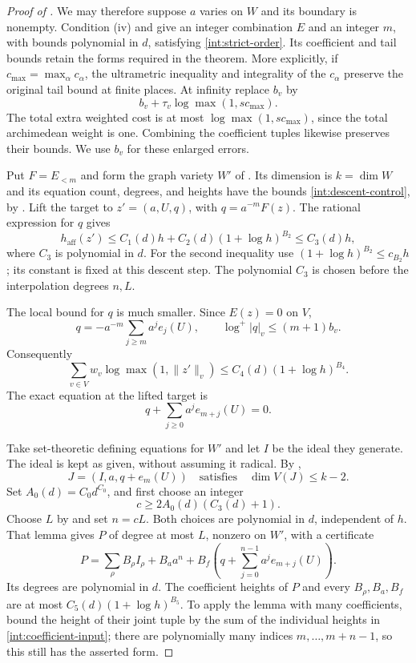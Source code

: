\begin{proof}[Proof of ]
We may therefore suppose $a$ varies on $W$ and its boundary is
nonempty.  Condition \textup{(iv)} and  give
an integer combination $E$ and an integer $m$, with bounds polynomial
in $d$, satisfying \eqref{int:strict-order}.  Its coefficient and
tail bounds retain the forms required in the theorem.  More
explicitly, if $c_{\max}=\max_\alpha c_\alpha$, the ultrametric
inequality and integrality of the $c_\alpha$ preserve the original
tail bound at finite places.  At infinity replace $b_v$ by
\[
 b_v+\tau_v\log\max(1,s c_{\max}).
\]
The total extra weighted cost is at most
$\log\max(1,s c_{\max})$, since the total archimedean weight is one.
Combining the coefficient tuples likewise preserves their bounds.
We use $b_v$ for these enlarged errors.

Put $F=E_{<m}$ and form the graph variety $W'$ of
.  Its dimension is $k=\dim W$ and its equation
count, degrees, and heights have the bounds
\eqref{int:descent-control}, by .  Lift the target
to $z'=(a,U,q)$, with $q=a^{-m}F(z)$.  The rational expression for
$q$ gives
\[
 h_{\mathrm{aff}}(z')
   \leq C_1(d)h+C_2(d)(1+\log h)^{B_2}
   \leq C_3(d)h,
\]
where $C_3$ is polynomial in $d$.  For the second inequality use
$(1+\log h)^{B_2}\leq c_{B_2}h$; its constant is fixed at this
descent step.  The polynomial $C_3$ is chosen before the interpolation
degrees $n,L$.

The local bound for $q$ is much smaller.  Since $E(z)=0$ on $V$,
\[
 q=-a^{-m}\sum_{j\geq m}a^je_j(U),
 \qquad
 \log^+|q|_v\leq(m+1)b_v.
\]
Consequently
\begin{equation}\label{int:lifted-local}
 \sum_{v\in V}w_v\log\max(1,\|z'\|_v)
    \leq C_4(d)(1+\log h)^{B_4}.
\end{equation}
The exact equation at the lifted target is
\[
 q+\sum_{j\geq0}a^je_{m+j}(U)=0.
\]

Take set-theoretic defining equations for $W'$ and let $I$ be the
ideal they generate.  The ideal is kept as given, without assuming
it radical.  By ,
\[
 J=(I,a,q+e_m(U))
 \quad\text{satisfies}\quad\dim V(J)\leq k-2.
\]
Set $A_0(d)=C_0d^{C_0}$, and first choose an integer
\begin{equation}\label{int:ratio-choice}
 c\geq 2A_0(d)(C_3(d)+1).
\end{equation}
Choose $L$ by  and set $n=cL$.
Both choices are polynomial in $d$, independent of $h$.  That lemma
gives $P$ of degree at most $L$, nonzero on $W'$, with a certificate
\begin{equation}\label{int:certificate}
 P=\sum_\rho B_\rho I_\rho+B_a a^n
       +B_f\left(q+\sum_{j=0}^{n-1}a^je_{m+j}(U)\right).
\end{equation}
Its degrees are polynomial in $d$.  The coefficient heights of $P$
and every $B_\rho,B_a,B_f$ are at most
$C_5(d)(1+\log h)^{B_5}$.  To apply the lemma with many coefficients,
bound the height of their joint tuple by the sum of the individual
heights in \eqref{int:coefficient-input}; there are polynomially many
indices $m,\ldots,m+n-1$, so this still has the asserted form.


\end{proof}
